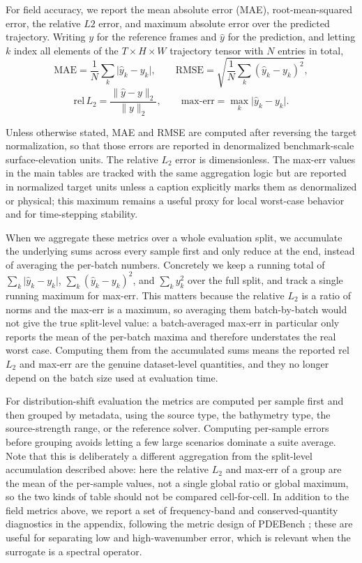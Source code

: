 For field accuracy, we report the mean absolute error (MAE), root-mean-squared error, the relative $L2$ error, and maximum absolute error over the predicted trajectory. Writing  $y$ for the reference frames and $\widehat{y}$ for the prediction, and letting $k$ index all elements of the $T \times H \times W$ trajectory tensor with $N$ entries in total,
\[
\mathrm{MAE} = \frac{1}{N}\sum_{k} \lvert \widehat{y}_k - y_k \rvert,
\qquad
\mathrm{RMSE} = \sqrt{\frac{1}{N}\sum_{k} (\widehat{y}_k - y_k)^2},
\]
\[
\mathrm{rel}\,L_2 = \frac{\lVert \widehat{y} - y \rVert_2}{\lVert y \rVert_2},
\qquad
\mathrm{max\text{-}err} = \max_{k} \lvert \widehat{y}_k - y_k \rvert .
\]

Unless otherwise stated, MAE and RMSE are computed after reversing the target normalization, so that those errors are reported in denormalized benchmark-scale surface-elevation units. The relative $L_2$ error is dimensionless. The max-err values in the main tables are tracked with the same aggregation logic but are reported in normalized target units unless a caption explicitly marks them as denormalized or physical; this maximum remains a useful proxy for local worst-case behavior and for time-stepping stability.

When we aggregate these metrics over a whole evaluation split, we accumulate the underlying sums across every sample first and only reduce at the end, instead of averaging the per-batch numbers. Concretely we keep a running total of $\sum_k \lvert \widehat{y}_k - y_k \rvert$, $\sum_k (\widehat{y}_k - y_k) ^ 2$, and $\sum_k y_k ^ 2$ over the full split, and track a single running maximum for max-err. This matters because the relative $L_2$ is a ratio of norms and the max-err is a maximum, so averaging them batch-by-batch would not give the true split-level value: a batch-averaged max-err in particular only reports the mean of the per-batch maxima and therefore understates the real worst case. Computing them from the accumulated sums means the reported rel\, $L_2$ and max-err are the genuine dataset-level quantities, and they no longer depend on the batch size used at evaluation time.

For distribution-shift evaluation the metrics are computed per sample first and then grouped by metadata, using the source type, the bathymetry type, the source-strength range, or the reference solver. Computing per-sample errors before grouping avoids letting a few large scenarios dominate a suite average. Note that this is deliberately a different aggregation from the split-level accumulation described above: here the relative $L_2$ and max-err of a group are the mean of the per-sample values, not a single global ratio or global maximum, so the two kinds of table should not be compared cell-for-cell. In addition to the field metrics above, we report a set of frequency-band and conserved-quantity diagnostics in the appendix, following the metric design of PDEBench \citep{takamoto2022pdebench}; these are useful for separating low and high-wavenumber error, which is relevant when the surrogate is a spectral operator.

